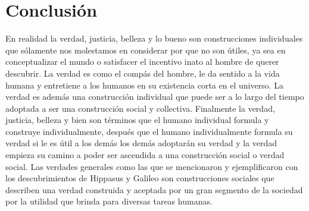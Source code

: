\documentclass{article}
\begin{document}
\section{Conclusión}
En realidad la verdad, justicia, belleza y lo bueno son construcciones individuales que sólamente nos molestamos en considerar por que no son útiles, ya sea en conceptualizar el mundo o satisfacer el incentivo inato al hombre de querer descubrir. La verdad es como el compás del hombre, le da sentido a la vida humana y entretiene a los humanos en su existencia corta en el universo. La verdad es además una construcción individual que puede ser a lo largo del tiempo adoptada a ser una construcción social y collectiva. Finalmente la verdad, justicia, belleza y bien son términos que el humano individual formula y construye individualmente, después que el humano individualmente formula su verdad si le es útil a los demás los demás adoptarán su verdad y la verdad empieza su camino a poder ser ascendida a una construcción social o verdad social. Las verdades generales como las que se mencionaron y ejemplificaron con los descubrimientos de Hippasus y Galileo son construcciones sociales que describen una verdad construida y aceptada por un gran segmento de la sociedad por la utilidad que brinda para diversas tareas humanas.




\end{document}
